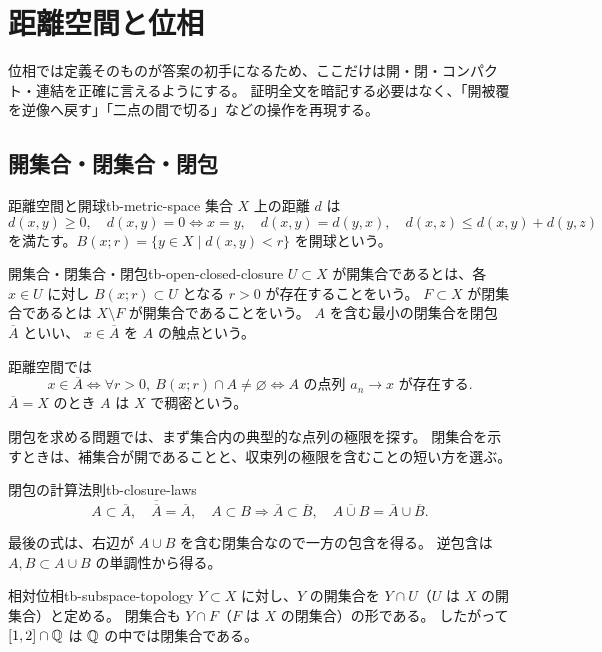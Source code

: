 \chapter{距離空間と位相}
\label{ch:tb-topology}

位相では定義そのものが答案の初手になるため、ここだけは開・閉・コンパクト・連結を正確に言えるようにする。
証明全文を暗記する必要はなく、「開被覆を逆像へ戻す」「二点の間で切る」などの操作を再現する。

\section{開集合・閉集合・閉包}

\begin{definition}{距離空間と開球}{tb-metric-space}
集合 $X$ 上の距離 $d$ は
\[
d(x,y)\ge0,\quad d(x,y)=0\Longleftrightarrow x=y,\quad
d(x,y)=d(y,x),\quad d(x,z)\le d(x,y)+d(y,z)
\]
を満たす。$B(x;r)=\{y\in X\mid d(x,y)<r\}$ を開球という。
\end{definition}

\begin{definition}{開集合・閉集合・閉包}{tb-open-closed-closure}
$U\subset X$ が開集合であるとは、各 $x\in U$ に対し
$B(x;r)\subset U$ となる $r>0$ が存在することをいう。
$F\subset X$ が閉集合であるとは $X\setminus F$ が開集合であることをいう。
$A$ を含む最小の閉集合を閉包 $\overline A$ といい、
$x\in\overline A$ を $A$ の触点という。
\end{definition}

距離空間では
\[
x\in\overline A
\Longleftrightarrow \forall r>0,\ B(x;r)\cap A\ne\varnothing
\Longleftrightarrow A\text{ の点列 }a_n\to x\text{ が存在する}.
\]
$\overline A=X$ のとき $A$ は $X$ で稠密という。

閉包を求める問題では、まず集合内の典型的な点列の極限を探す。
閉集合を示すときは、補集合が開であることと、収束列の極限を含むことの短い方を選ぶ。

\begin{proposition}{閉包の計算法則}{tb-closure-laws}
\[
A\subset\overline A,\quad
\overline{\overline A}=\overline A,\quad
A\subset B\Rightarrow\overline A\subset\overline B,\quad
\overline{A\cup B}=\overline A\cup\overline B.
\]
\end{proposition}

最後の式は、右辺が $A\cup B$ を含む閉集合なので一方の包含を得る。
逆包含は $A,B\subset A\cup B$ の単調性から得る。

\begin{definition}{相対位相}{tb-subspace-topology}
$Y\subset X$ に対し、$Y$ の開集合を $Y\cap U$（$U$ は $X$ の開集合）と定める。
閉集合も $Y\cap F$（$F$ は $X$ の閉集合）の形である。
したがって $[1,2]\cap\mathbb{Q}$ は $\mathbb{Q}$ の中では閉集合である。
\end{definition}

